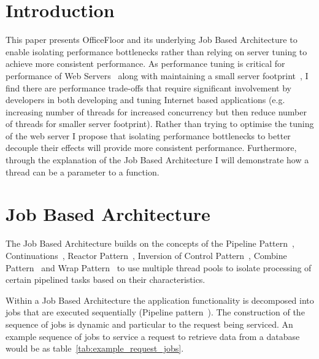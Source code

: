 \documentclass[conference]{ieee/IEEEtran}
\begin{document}
%
\IEEEpeerreviewmaketitle



\section{Introduction}
This paper presents OfficeFloor and its underlying Job Based Architecture to
enable isolating performance bottlenecks rather than relying on server tuning to
achieve more consistent performance. As performance tuning is critical for
performance of Web Servers~\cite{tuning-important,tuning-os-important} along
with maintaining a small server footprint~\cite{low-server-footprint}, I find
there are performance trade-offs that require significant involvement by
developers in both developing and tuning Internet based applications (e.g.
increasing number of threads for increased concurrency but then reduce number of
threads for smaller server footprint).  Rather than trying to optimise the
tuning of the web server I propose that isolating performance bottlenecks to
better decouple their effects will provide more consistent performance.
Furthermore, through the explanation of the Job Based Architecture I will
demonstrate how a thread can be a parameter to a function.


\section{Job Based Architecture}
The Job Based Architecture builds on the concepts of the Pipeline
Pattern~\cite{pipeline}, Continuations~\cite{continuations}, Reactor
Pattern~\cite{reactor}, Inversion of Control Pattern~\cite{ioc}, Combine
Pattern~\cite{pipeline} and Wrap Pattern~\cite{pipeline} to use multiple thread
pools to isolate processing of certain pipelined tasks based on their
characteristics.

Within a Job Based Architecture the application functionality is decomposed into
jobs that are executed sequentially (Pipeline pattern~\cite{pipeline}).  The
construction of the sequence of jobs is dynamic and particular to the request
being serviced.  An example sequence of jobs to service a request to retrieve
data from a database would be as table~\ref{tab:example_request_jobs}.
\end{document}
